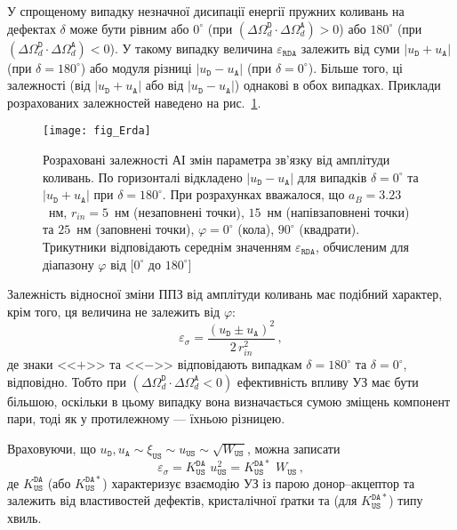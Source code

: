 У спрощеному випадку незначної дисипації енергії пружних коливань на дефектах
$\delta$ може бути рівним або $0^\circ$ (при $(\Delta\Omega_d^\mathtt{D}\cdot\Delta\Omega_d^\mathtt{A})>0$)
або $180^\circ$ (при $(\Delta\Omega_d^\mathtt{D}\cdot\Delta\Omega_d^\mathtt{A})<0$).
У такому випадку величина $\varepsilon_{\mathtt{RDA}}$ залежить
від суми $|u_\mathtt{D}+u_\mathtt{A}|$ (при $\delta=180^\circ$)
або модуля різниці $|u_\mathtt{D}-u_\mathtt{A}|$ (при $\delta=0^\circ$).
Більше того, ці залежності (від $|u_\mathtt{D}+u_\mathtt{A}|$ або від $|u_\mathtt{D}-u_\mathtt{A}|$) однакові в обох випадках.
Приклади розрахованих залежностей наведено на рис.~\ref{fig_Erda}.

\begin{figure}
\center
\texttt{[image: fig\_Erda]}
\caption{\label{fig_Erda}
Розраховані залежності АІ змін параметра зв'язку від амплітуди коливань.
По горизонталі відкладено $|u_\mathtt{D}-u_\mathtt{A}|$ для випадків $\delta=0^\circ$ та
$|u_\mathtt{D}+u_\mathtt{A}|$ при $\delta=180^\circ$.
При розрахунках вважалося, що
$a_B=3.23$~нм,
$r_{in}=5$~нм (незаповнені точки), $15$~нм (напівзаповнені точки) та $25$~нм (заповнені точки),
$\varphi=0^\circ$ (кола), $90^\circ$ (квадрати).
Трикутники відповідають середнім значенням $\varepsilon_{\mathtt{RDA}}$,
обчисленим для діапазону $\varphi$ від $[0^\circ$ до $180^\circ]$
}%
\end{figure}

Залежність відносної зміни ППЗ від амплітуди коливань має подібний характер, крім того,
ця величина не залежить від $\varphi$:
\begin{equation}
\label{eqEpsSig}
\varepsilon_{\sigma}=\frac{(u_\mathtt{D}\pm u_\mathtt{A})^2}{2\,r_{in}^2}\,,
\end{equation}
де
знаки <<$+$>> та <<$-$>> відповідають випадкам $\delta=180^\circ$ та $\delta=0^\circ$, відповідно.
Тобто при $(\Delta\Omega_d^\mathtt{D}\cdot\Delta\Omega_d^\mathtt{A}<0)$ ефективність впливу УЗ має бути більшою,
оскільки в цьому випадку вона визначається сумою зміщень компонент пари,
тоді як у протилежному --- їхньою різницею.


Враховуючи, що $u_\mathtt{D},u_\mathtt{A}\sim \xi_\mathtt{US}\sim u_\mathtt{US}\sim \sqrt{W_\mathtt{US}}$, можна записати
\begin{equation}
\label{eqEpsSigUS}
\varepsilon_{\sigma}=K_\mathtt{US}^\mathtt{DA}\,\,u_{\mathtt{US}}^2=K_\mathtt{US}^\mathtt{DA*}\,\,W_{\mathtt{US}}\,,
\end{equation}
де $K_\mathtt{US}^\mathtt{DA}$ (або $K_\mathtt{US}^\mathtt{DA*}$) характеризує взаємодію УЗ із парою донор--акцептор
та залежить від властивостей дефектів, кристалічної ґратки та (для $K_\mathtt{US}^\mathtt{DA*}$) типу хвиль.

